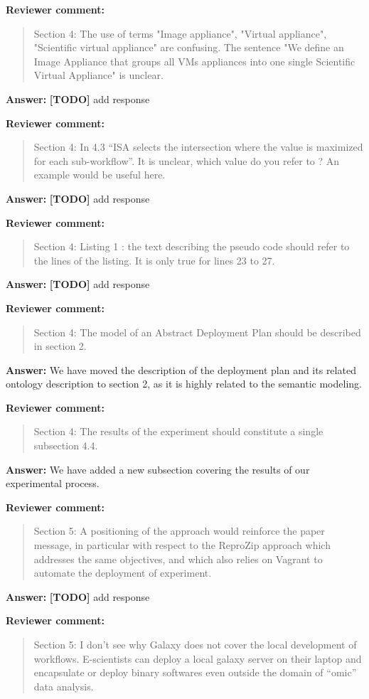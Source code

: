 \documentclass{letter}
\newenvironment{review}%
{\textbf{Reviewer comment:}\begin{quote}}%
{\end{quote}}%
\newcommand{\todo}[1]{%
      \color{red}\textbf{[TODO]} #1\color{black}}
\newcommand{\answer}[1]{%
      \textbf{Answer:} #1}
\begin{document}
\begin{letter}{}
\begin{review}
Section 4: The use of terms "Image appliance", "Virtual appliance", "Scientific virtual appliance" are confusing. The sentence "We define an Image Appliance that groups all VMs appliances into one single Scientific Virtual Appliance" is unclear.
\end{review}

\answer{\todo{add response}}


\begin{review}
Section 4: In 4.3 ``ISA selects the intersection where the value is maximized for each sub-workflow''. It is unclear, which value do you refer to ? An example would be useful here.
\end{review}

\answer{\todo{add response}}


\begin{review}
Section 4: Listing 1 : the text describing the pseudo code should refer to the lines of the listing. It is only true for lines 23 to 27.
\end{review}

\answer{\todo{add response}}


\begin{review}
Section 4: The model of an Abstract Deployment Plan should be described in section 2.
\end{review}

\answer{We have moved the description of the deployment plan and its related ontology description to section 2, as it is highly related to the semantic modeling.}


\begin{review}
Section 4: The results of the experiment should constitute a single subsection 4.4.
\end{review}

\answer{We have added a new subsection covering the results of our experimental process.}


\begin{review}
Section 5: A positioning of the approach would reinforce the paper message, in particular with respect to the ReproZip approach which addresses the same objectives, and which also relies on Vagrant to automate the deployment of experiment.
\end{review}

\answer{\todo{add response}}


\begin{review}
Section 5: I don't see why Galaxy does not cover the local development of workflows. E-scientists can deploy a local galaxy server on their laptop and encapsulate or deploy binary softwares even outside the domain of ``omic'' data analysis.
\end{review}


\end{letter}
\end{document}
